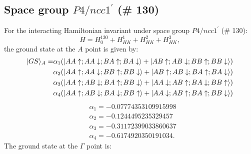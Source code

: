 \documentclass[aps,reprint,notitlepage,onecolumn,12pt]{revtex4-2}
\DeclarePairedDelimiter\ket{\lvert}{\rangle}%
\numberwithin{equation}{section}
\def\sgb{$P4/ncc1^\prime$ (\# 130)}
\begin{document}
\subsection{Space group \sgb}
\label{sec:sg130}
For the interacting Hamiltonian invariant under space group \sgb:
\begin{equation}
    H=H^{130}_{0}+H^{1}_{HK}+H^{2}_{HK}+H^{3}_{HK},
\end{equation}
the ground state at the $A$ point is given by:
\begin{align}
\ket{GS}_{A}=&\alpha_{1}(\ket{AA\uparrow;AA\downarrow;BA\uparrow;BA\downarrow}+\ket{AB\uparrow;AB\downarrow;BB\uparrow;BB\downarrow}) \nonumber \\
&\alpha_{2}(\ket{AA\uparrow;AA\downarrow;BB\uparrow;BB\downarrow}+\ket{AB\uparrow;AB\downarrow;BA\uparrow;BA\downarrow}) \nonumber \\
&\alpha_{3}(\ket{AA\uparrow;AB\downarrow;BA\uparrow;BB\downarrow}+\ket{AA\downarrow;AB\uparrow;BA\downarrow;BB\uparrow}) \nonumber \\
&\alpha_{4}(\ket{AA\uparrow;AB\downarrow;BA\downarrow;BB\uparrow}+\ket{AA\downarrow;AB\uparrow;BA\uparrow;BB\downarrow}) \nonumber
\end{align}
\begin{align}
&\alpha_{1}=-0.07774353109915998\nonumber \\
&\alpha_{2}=-0.1244495235329457\nonumber \\
&\alpha_{3}=-0.31172399033860637\nonumber \\
&\alpha_{4}=-0.6174920350191034\nonumber.
\end{align}
The ground state at the $\Gamma$ point is:
\end{document}
